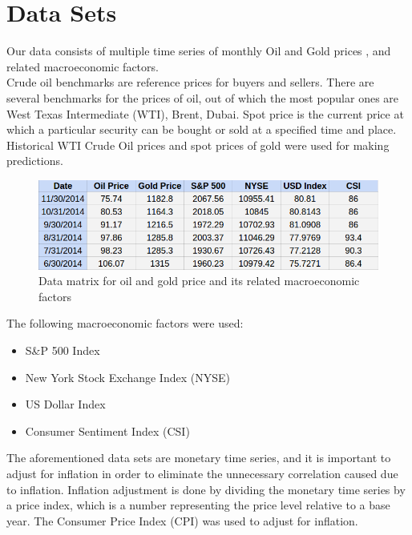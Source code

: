 \documentclass[runningheads]{llncs}
\begin{document}
\newpage

\section{Data Sets}

\noindent Our data consists of multiple time series of monthly Oil and Gold prices \cite{quandal}, and related macroeconomic factors.\\

\noindent Crude oil benchmarks are reference prices for buyers and sellers. There are several benchmarks for the prices of oil, out of which the most popular ones are West Texas Intermediate (WTI), Brent, Dubai. 
Spot price is the current price at which a particular security can be bought or sold at a specified time and place. \\
Historical WTI Crude Oil prices and spot prices of gold were used for making predictions.

\begin{figure}
\centering
\includegraphics[width=\textwidth]{DataMatrices.png}
\caption{Data matrix for oil and gold price and its related macroeconomic factors}
\label{fig:DataMatrices.png}
\end{figure}

The following macroeconomic factors were used:

\begin {itemize}
\item S\&P 500 Index \cite{quandal}
\item New York Stock Exchange Index (NYSE) \cite{quandal}
\item US Dollar Index \cite{quandal}
\item Consumer Sentiment Index (CSI) \cite{csi}
\end {itemize}


\noindent The aforementioned data sets are monetary time series, and it is important to adjust for inflation in order to eliminate the unnecessary correlation caused due to inflation. Inflation adjustment is done by dividing the monetary time series by a price index, which is a number representing the price level relative to a base year. The Consumer Price Index (CPI) was used to adjust for inflation.
\end{document}
